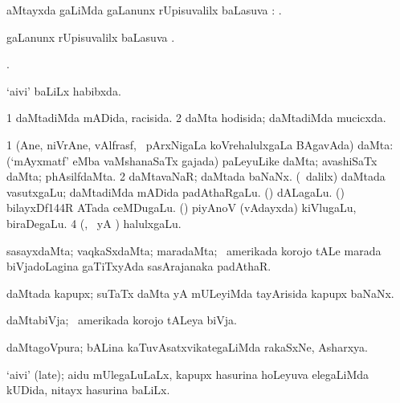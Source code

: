 \bentry
{}
\gl{\uparx}
\bmng
{} aMtayxda \gu gaLiMda \kirxvi gaLanunx rUpisuvalilx baLasuva \uparx: . 
\emng
\eentry

\bentry
{}
\gl{\uparx}
\bmng
\nA gaLanunx rUpisuvalilx baLasuva \uparx. 
\emng
\eentry

\bentry
{}
\gl{\saMkiSx}
\bmng
{}. 
\emng
\eentry

\bentry
{}
\gl{\gu}
\bmng
`aivi' baLiLx habibxda. 
\emng
\eentry

\bentry
{}
\gl{\gu}
\bmng
\bnum
\num{1} daMtadiMda mADida, racisida. 
\num{2} daMta hodisida; daMtadiMda mucicxda. 
\enum
\emng
\eentry

\bentry
{}
\gl{\nA}
\bmng
\bnum
\num{1} (Ane, niVrAne, vAlfrasf, \mo\ pArxNigaLa koVrehalulxgaLa BAgavAda) daMta:  (`mAyxmatf' eMba vaMshanaSaTx gajada) paLeyuLike daMta; avashiSaTx daMta; phAsilfdaMta. 
\num{2} daMtavaNaR; daMtada baNaNx. 
 (\sA\ \bava dalilx) 
\banum
{} daMtada vasutxgaLu; daMtadiMda mADida padAthaRgaLu. 
 (\ashi) dALagaLu. 
 (\ashi) bilayxDf\char144R ATada ceMDugaLu. 
 (\ashi) piyAnoV (vAdayxda) kiVlugaLu, biraDegaLu. 
\eanum
\numie
\num{4} (\ashi, \Eva\ yA \bava) halulxgaLu. 
\enum
\emng

\noindent 
\gl{\pagu}
\bmng
{}  sasayxdaMta; vaqkaSxdaMta; maradaMta; \da\ amerikada korojo tALe marada biVjadoLagina gaTiTxyAda sasArajanaka padAthaR. 
\emng
\eentry

\bentry
{}
\gl{\nA}
\bmng
daMtada kapupx; suTaTx daMta yA mULeyiMda tayArisida kapupx baNaNx. 
\emng
\eentry

\bentry
{}
\gl{\nA}
\bmng
daMtabiVja; \da\ amerikada korojo tALeya biVja. 
\emng
\eentry

\bentry
{}
\gl{\nA}
\bmng
daMtagoVpura; bALina kaTuvAsatxvikategaLiMda rakaSxNe, Asharxya. 
\emng
\eentry

\bentry
{}
\gl{\nA}
\bmng
`aivi' (late); aidu mUlegaLuLaLx, kapupx hasurina hoLeyuva elegaLiMda kUDida, nitayx hasurina baLiLx.   
\emng
\eentry


